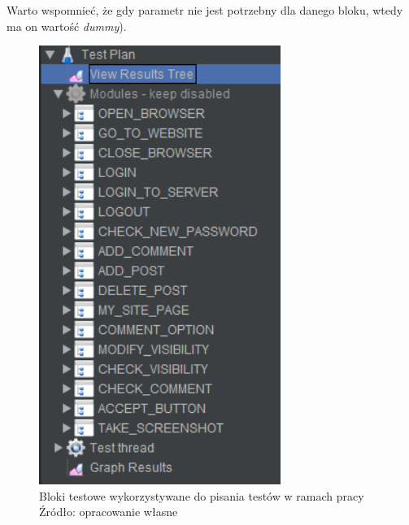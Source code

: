 Warto wspomnieć, że gdy parametr nie jest potrzebny dla danego bloku, wtedy ma on wartość \textit{dummy}).



\begin{figure}[H]
\centering
\captionsetup{justification=centering}
\includegraphics[width=0.7\textwidth]{Modules.PNG}
\caption[Bloki testowe wykorzystywane do pisania testów w ramach pracy]{\label{fig:ham}Bloki testowe wykorzystywane do pisania testów w ramach pracy \\ Źródło: opracowanie własne}
\end{figure}

